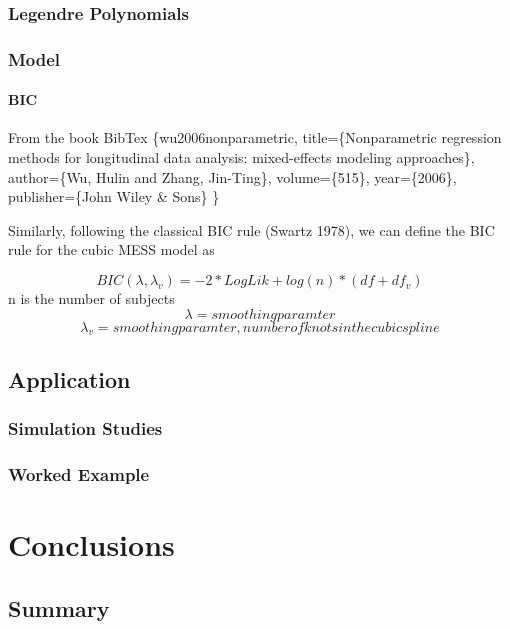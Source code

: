 \documentclass[]{book}
\theoremstyle{definition}
\theoremstyle{definition}
\theoremstyle{remark}
\begin{document}
\subsection{Legendre Polynomials}\label{legendre-polynomials}

\subsection{Model}\label{model}

\subsubsection{BIC}\label{bic}

From the book BibTex \citet{book}\{wu2006nonparametric,
title=\{Nonparametric regression methods for longitudinal data analysis:
mixed-effects modeling approaches\}, author=\{Wu, Hulin and Zhang,
Jin-Ting\}, volume=\{515\}, year=\{2006\}, publisher=\{John Wiley \&
Sons\} \}

Similarly, following the classical BIC rule (Swartz 1978), we can define
the BIC rule for the cubic MESS model as

\[BIC(\lambda, \lambda_v ) = -2*LogLik + log(n)*(df + df_v)\] n is the
number of subjects \[\lambda = smoothing paramter\]
\[\lambda_v = smoothing paramter, number of knots in the cubic spline\]

\section{Application}\label{application-1}

\subsection{Simulation Studies}\label{simulation-studies}

\subsection{Worked Example}\label{worked-example}

\chapter{Conclusions}\label{conclusions}

\section{Summary}\label{summary}
\end{document}
